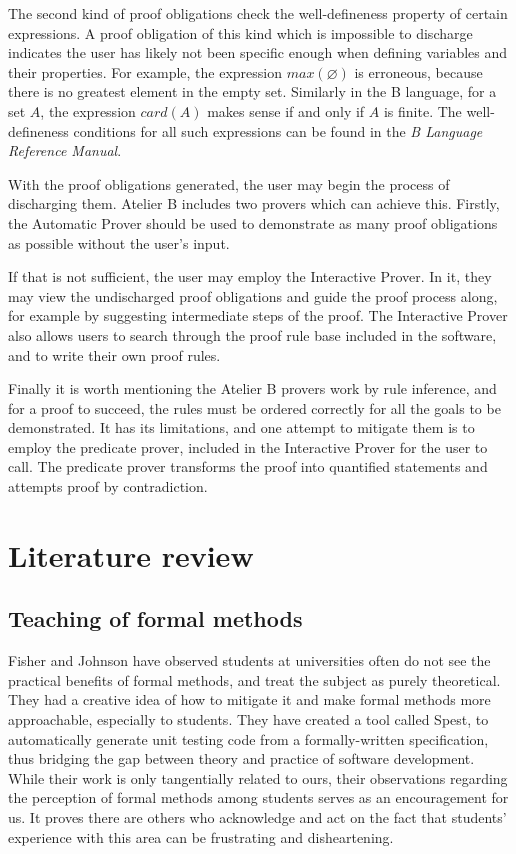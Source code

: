 \documentclass[12pt,journal,duplex]{IEEEtran}
\begin{document}
	The second kind of proof obligations check the well-defineness property of certain expressions. A proof obligation of this kind which is impossible to discharge indicates the user has likely not been specific enough when defining variables and their properties. For example, the expression $max(\varnothing)$ is erroneous, because there is no greatest element in the empty set. Similarly in the B language, for a set $A$, the expression $card(A)$ makes sense if and only if $A$ is finite. The well-defineness conditions for all such expressions can be found in the \emph{B Language Reference Manual}\cite{b reference}.

	With the proof obligations generated, the user may begin the process of discharging them. Atelier B includes two provers which can achieve this. Firstly, the Automatic Prover should be used to demonstrate as many proof obligations as possible without the user's input.

	If that is not sufficient, the user may employ the Interactive Prover. In it, they may view the undischarged proof obligations and guide the proof process along, for example by suggesting intermediate steps of the proof. The Interactive Prover also allows users to search through the proof rule base included in the software, and to write their own proof rules.

	Finally it is worth mentioning the Atelier B provers work by rule inference, and for a proof to succeed, the rules must be ordered correctly for all the goals to be demonstrated. It has its limitations, and one attempt to mitigate them is to employ the predicate prover, included in the Interactive Prover for the user to call. The predicate prover transforms the proof into quantified statements and attempts proof by contradiction.


	\section{Literature review}

	\subsection{Teaching of formal methods}

	Fisher and Johnson have observed students at universities often do not see the practical benefits of formal methods, and treat the subject as purely theoretical.\cite{test generation} They had a creative idea of how to mitigate it and make formal methods more approachable, especially to students. They have created a tool called Spest, to automatically generate unit testing code from a formally-written specification, thus bridging the gap between theory and practice of software development. While their work is only tangentially related to ours, their observations regarding the perception of formal methods among students serves as an encouragement for us. It proves there are others who acknowledge and act on the fact that students' experience with this area can be frustrating and disheartening.
\end{document}
